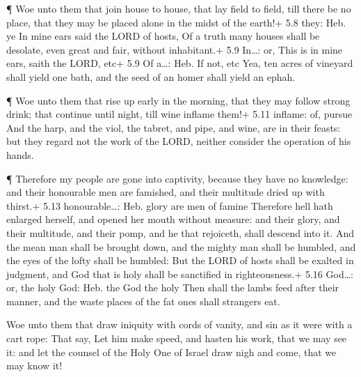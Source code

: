  ¶ Woe unto them that join house to house, that lay field to
field, till there be no place, that they may be placed alone in the
midst of the earth!+ 5.8 they: Heb. ye  In mine ears said
the LORD of hosts, Of a truth many houses shall be desolate, even great
and fair, without inhabitant.+ 5.9 In\ldots: or, This is in mine ears,
saith the LORD, etc+ 5.9 Of a\ldots: Heb. If not, etc  Yea,
ten acres of vineyard shall yield one bath, and the seed of an homer
shall yield an ephah.

 ¶ Woe unto them that rise up early in the morning, that
they may follow strong drink; that continue until night, till wine
inflame them!+ 5.11 inflame: of, pursue  And the harp, and
the viol, the tabret, and pipe, and wine, are in their feasts: but they
regard not the work of the LORD, neither consider the operation of his
hands.

 ¶ Therefore my people are gone into captivity, because
they have no knowledge: and their honourable men are famished, and their
multitude dried up with thirst.+ 5.13 honourable\ldots: Heb. glory are
men of famine  Therefore hell hath enlarged herself, and
opened her mouth without measure: and their glory, and their multitude,
and their pomp, and he that rejoiceth, shall descend into it.
 And the mean man shall be brought down, and the mighty man
shall be humbled, and the eyes of the lofty shall be humbled:
 But the LORD of hosts shall be exalted in judgment, and
God that is holy shall be sanctified in righteousness.+ 5.16 God\ldots:
or, the holy God: Heb. the God the holy  Then shall the
lambs feed after their manner, and the waste places of the fat ones
shall strangers eat.

 Woe unto them that draw iniquity with cords of vanity, and
sin as it were with a cart rope:  That say, Let him make
speed, and hasten his work, that we may see it: and let the counsel of
the Holy One of Israel draw nigh and come, that we may know it!

